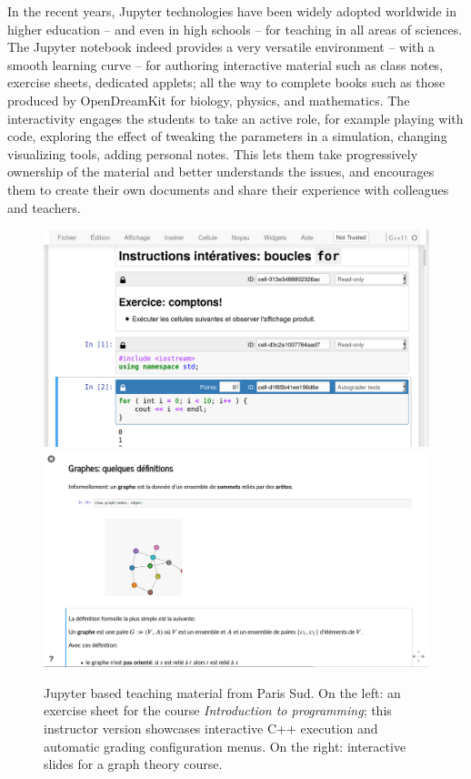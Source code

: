   In the recent years, Jupyter technologies have been widely adopted
  worldwide in higher education -- and even in high schools -- for
  teaching in all areas of sciences. The Jupyter notebook indeed
  provides a very versatile environment -- with a smooth learning
  curve -- for authoring interactive material such as class notes,
  exercise sheets, dedicated applets; all the way to complete books
  such as those produced by OpenDreamKit for biology, physics, and
  mathematics. The interactivity engages the students to take an
  active role, for example playing with code, exploring the effect of
  tweaking the parameters in a simulation, changing visualizing tools,
  adding personal notes. This lets them take progressively ownership
  of the material and better understands the issues, and encourages
  them to create their own documents and share their experience with
  colleagues and teachers.

  \begin{figure}[ht!]\centering
  \includegraphics[width=.45\textwidth]{images/teaching-cling}\quad
  \includegraphics[width=.45\textwidth]{images/teaching-graphs}
  \caption{Jupyter based teaching material from Paris Sud. On the
    left: an exercise sheet for the course \emph{Introduction to
      programming}; this instructor version showcases interactive C++
    execution and automatic grading configuration menus. On the right:
    interactive slides for a graph theory course.}\label{fig:teaching-cling}
  \end{figure}

